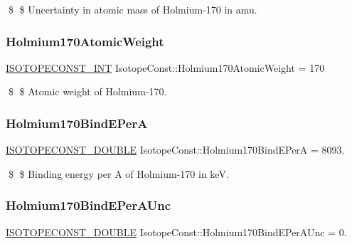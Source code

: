 \$ \$ Uncertainty in atomic mass of Holmium-\/170 in amu. \mbox{\label{group___isotope_const-_holmium-_ho170_ga084826f0731b0d8c5bc23a1abc0a87b1}} 
\subsubsection{\texorpdfstring{Holmium170\+Atomic\+Weight}{Holmium170AtomicWeight}}
{\footnotesize\ttfamily \mbox{\hyperlink{group___isotope_const-_macros_ga5f18360b3e99483a35c32d789e62621c}{I\+S\+O\+T\+O\+P\+E\+C\+O\+N\+S\+T\+\_\+\+I\+NT}} Isotope\+Const\+::\+Holmium170\+Atomic\+Weight = 170}

\$ \$ Atomic weight of Holmium-\/170. \mbox{\label{group___isotope_const-_holmium-_ho170_ga8b6e24bc5354a17bcf6a6e94d40be2fd}} 
\subsubsection{\texorpdfstring{Holmium170\+Bind\+E\+PerA}{Holmium170BindEPerA}}
{\footnotesize\ttfamily \mbox{\hyperlink{group___isotope_const-_macros_ga8f45a7272ce02c0b4c65c44636ed719a}{I\+S\+O\+T\+O\+P\+E\+C\+O\+N\+S\+T\+\_\+\+D\+O\+U\+B\+LE}} Isotope\+Const\+::\+Holmium170\+Bind\+E\+PerA = 8093.}

\$ \$ Binding energy per A of Holmium-\/170 in keV. \mbox{\label{group___isotope_const-_holmium-_ho170_ga024ed77f83baeeaa0345f626595e7ac3}} 
\subsubsection{\texorpdfstring{Holmium170\+Bind\+E\+Per\+A\+Unc}{Holmium170BindEPerAUnc}}
{\footnotesize\ttfamily \mbox{\hyperlink{group___isotope_const-_macros_ga8f45a7272ce02c0b4c65c44636ed719a}{I\+S\+O\+T\+O\+P\+E\+C\+O\+N\+S\+T\+\_\+\+D\+O\+U\+B\+LE}} Isotope\+Const\+::\+Holmium170\+Bind\+E\+Per\+A\+Unc = 0.}


